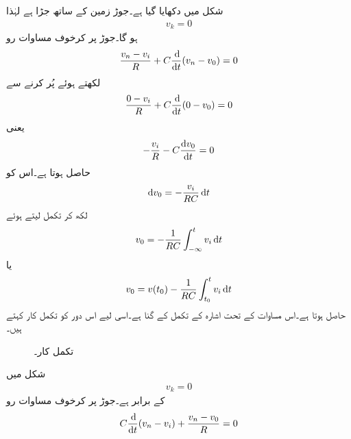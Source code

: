 شکل  میں  دکھایا گیا ہے۔جوڑ  زمین کے ساتھ جڑا ہے لہٰذا
\begin{align*}
v_k=0
\end{align*}
ہو گا۔جوڑ  پر کرخوف مساوات رو
\begin{align*}
\frac{v_n-v_i}{R}+C \frac{\dif }{\dif t}(v_n-v_0)=0
\end{align*}
لکھتے ہوئے  پُر کرنے سے
\begin{align*}
\frac{0-v_i}{R}+C \frac{\dif }{\dif t}(0-v_0)=0
\end{align*}
یعنی
\begin{align*}
-\frac{v_i}{R}-C \frac{\dif v_0}{\dif t}=0
\end{align*}
حاصل ہوتا  ہے۔اس کو
\begin{align*}
\dif v_0=-\frac{v_i}{RC} \dif t
\end{align*}
لکھ کر تکمل لیتے ہوئے
\begin{align}
v_0=-\frac{1}{RC} \int_{-\infty}^{t} v_i \dif t
\end{align}
یا
\begin{align}\label{مساوات_امالہ_تکمل_کار_الف}
v_0=v(t_0)-\frac{1}{RC} \int_{t_0}^{t} v_i \dif t
\end{align}
حاصل ہوتا ہے۔اس مساوات کے تحت  اشارہ   کے تکمل کے  گنا ہے۔اسی لیے اس دور کو تکمل کار کہتے ہیں۔
\begin{figure}
\centering
{}
\caption{تکمل کار۔}
\label{شکل_امالہ_تکمل_کار}
\end{figure}
شکل  میں
\begin{align*}
v_k=0
\end{align*}
کے برابر ہے۔جوڑ  پر کرخوف مساوات رو
\begin{align*}
C\frac{\dif }{\dif t}(v_n-v_i)+\frac{v_n-v_0}{R}=0
\end{align*}
